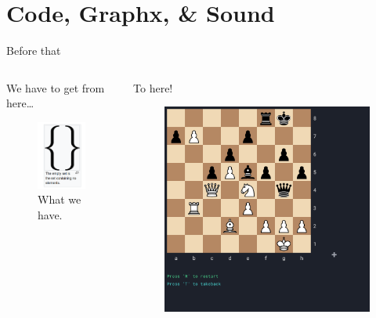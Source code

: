\documentclass[english]{beamer}
\begin{document}
\section{Code, Graphx, \& Sound}
\begin{frame}{Before that}
    \begin{columns}[T]
        \begin{column}{.5\textwidth}
            We have to get from here\dots
            \begin{figure}
                \centering
                \includegraphics[width=.65\textwidth]{images/empty_set.png}
                \caption{What we have.}
            \end{figure}
        \end{column}
        \begin{column}{.5\textwidth}
            To here!
            \begin{figure}
                \centering
                \includegraphics[width=.9\textwidth]{images/gui_example.png}

\end{figure}
\end{column}
\end{columns}
\end{frame}
\end{document}
